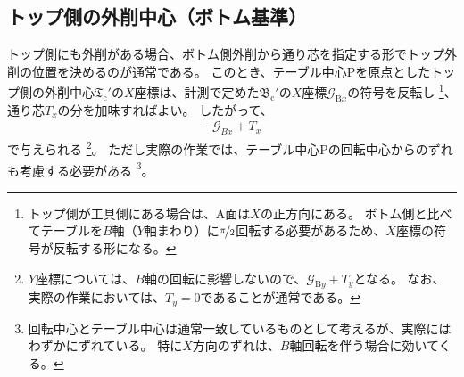\subsection{トップ側の外削中心（ボトム基準）}
トップ側にも外削がある場合、ボトム側外削から通り芯を指定する形でトップ外削の位置を決めるのが通常である。
このとき、テーブル中心Pを原点としたトップ側の外削中心$\mathfrak T_\mathrm c'$の$X$座標は、計測で定めた$\mathfrak B_\mathrm c'$の$X$座標$\mathcal G_{\mathrm Bx}$の符号を反転し
\footnote{トップ側が工具側にある場合は、A面は$X$の正方向にある。
ボトム側と比べてテーブルを$B$軸（$Y$軸まわり）に$\nicefrac\pi2$回転する必要があるため、$X$座標の符号が反転する形になる。}、
通り芯$T_x$の分を加味すればよい。
したがって、
\begin{align}
  \label{eq:BbasedTx}
  -\mathcal G_{Bx}+T_x
\end{align}
で与えられる
\footnote{$Y$座標については、$B$軸の回転に影響しないので、$\mathcal G_{\mathrm By}+T_y$となる。
なお、実際の作業においては、$T_y = 0$であることが通常である。}。
ただし実際の作業では、テーブル中心Pの回転中心からのずれも考慮する必要がある
\footnote{回転中心とテーブル中心は通常一致しているものとして考えるが、実際にはわずかにずれている。
特に$X$方向のずれは、$B$軸回転を伴う場合に効いてくる。}。



\clearpage


